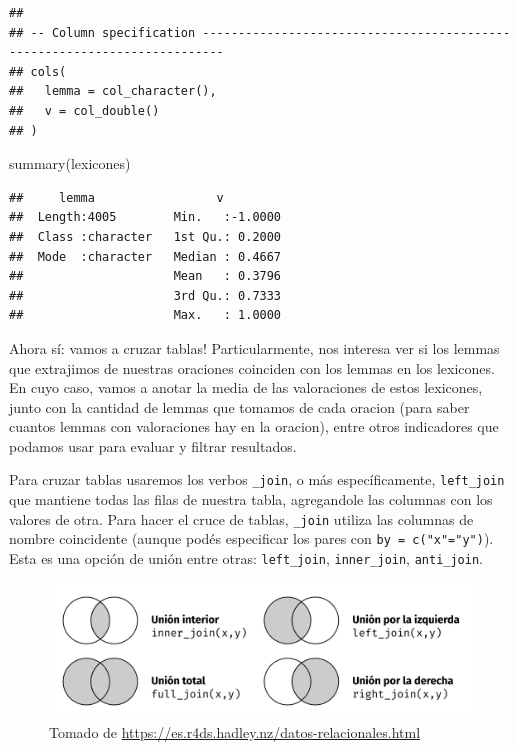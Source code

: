 \documentclass[
]{book}
\newenvironment{Shaded}{\begin{snugshade}}{\end{snugshade}}
\newcommand{\FunctionTok}[1]{\textcolor[rgb]{0.00,0.00,0.00}{#1}}
\newcommand{\NormalTok}[1]{#1}
\begin{document}
\begin{verbatim}
## 
## -- Column specification -------------------------------------------------------------------------
## cols(
##   lemma = col_character(),
##   v = col_double()
## )
\end{verbatim}

\begin{Shaded}
\begin{Highlighting}[]
\FunctionTok{summary}\NormalTok{(lexicones)}
\end{Highlighting}
\end{Shaded}

\begin{verbatim}
##     lemma                 v          
##  Length:4005        Min.   :-1.0000  
##  Class :character   1st Qu.: 0.2000  
##  Mode  :character   Median : 0.4667  
##                     Mean   : 0.3796  
##                     3rd Qu.: 0.7333  
##                     Max.   : 1.0000
\end{verbatim}

Ahora sí: vamos a cruzar tablas! Particularmente, nos interesa ver si los lemmas que extrajimos de nuestras oraciones coinciden con los lemmas en los lexicones.
En cuyo caso, vamos a anotar la media de las valoraciones de estos lexicones, junto con la cantidad de lemmas que tomamos de cada oracion (para saber cuantos lemmas con valoraciones hay en la oracion), entre otros indicadores que podamos usar para evaluar y filtrar resultados.

Para cruzar tablas usaremos los verbos \texttt{\_join}, o más específicamente, \texttt{left\_join} que mantiene todas las filas de nuestra tabla, agregandole las columnas con los valores de otra. Para hacer el cruce de tablas, \texttt{\_join} utiliza las columnas de nombre coincidente (aunque podés especificar los pares con \texttt{by\ =\ c("x"="y")}). Esta es una opción de unión entre otras: \texttt{left\_join}, \texttt{inner\_join}, \texttt{anti\_join}.

\begin{figure}
\centering
\includegraphics{images/join-venn.jpg}
\caption{Tomado de \url{https://es.r4ds.hadley.nz/datos-relacionales.html}}
\end{figure}
\end{document}
